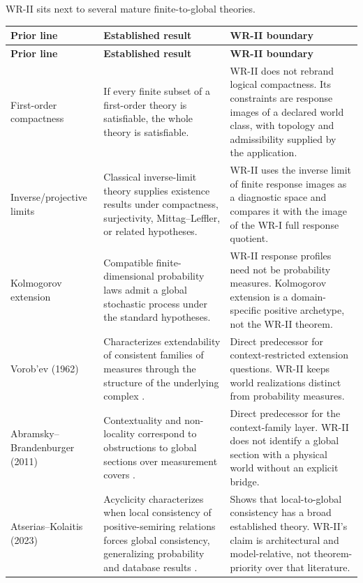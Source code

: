 \documentclass[11pt]{article}
\begin{document}
WR-II sits next to several mature finite-to-global theories.

\begin{longtable}{>{\raggedright\arraybackslash}p{}
                  >{\raggedright\arraybackslash}p{}
                  >{\raggedright\arraybackslash}p{}}
\toprule
\textbf{Prior line} & \textbf{Established result} & \textbf{WR-II boundary}\\
\midrule
\endfirsthead
\toprule
\textbf{Prior line} & \textbf{Established result} & \textbf{WR-II boundary}\\
\midrule
\endhead

First-order compactness &
If every finite subset of a first-order theory is satisfiable, the whole theory
is satisfiable. &
WR-II does not rebrand logical compactness. Its constraints are response images
of a declared world class, with topology and admissibility supplied by the
application. \\[5pt]

Inverse/projective limits &
Classical inverse-limit theory supplies existence results under compactness,
surjectivity, Mittag--Leffler, or related hypotheses. &
WR-II uses the inverse limit of finite response images as a diagnostic space and
compares it with the image of the WR-I full response quotient. \\[5pt]

Kolmogorov extension &
Compatible finite-dimensional probability laws admit a global stochastic
process under the standard hypotheses. &
WR-II response profiles need not be probability measures. Kolmogorov extension
is a domain-specific positive archetype, not the WR-II theorem. \\[5pt]

Vorob'ev (1962) &
Characterizes extendability of consistent families of measures through the
structure of the underlying complex \cite{Vorobev1962}. &
Direct predecessor for context-restricted extension questions. WR-II keeps
world realizations distinct from probability measures. \\[5pt]

Abramsky--Brandenburger (2011) &
Contextuality and non-locality correspond to obstructions to global sections
over measurement covers \cite{AbramskyBrandenburger2011}. &
Direct predecessor for the context-family layer. WR-II does not identify a
global section with a physical world without an explicit bridge. \\[5pt]

Atserias--Kolaitis (2023) &
Acyclicity characterizes when local consistency of positive-semiring relations
forces global consistency, generalizing probability and database results
\cite{AtseriasKolaitis2023}. &
Shows that local-to-global consistency has a broad established theory. WR-II's
claim is architectural and model-relative, not theorem-priority over that
literature. \\
\bottomrule
\end{longtable}
\end{document}
